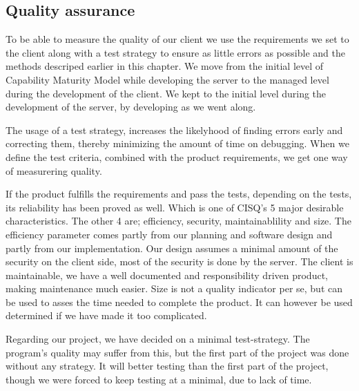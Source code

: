 \subsection{Quality assurance}
To be able to measure the quality of our client we use the requirements we set to the client along with a test strategy to ensure as little errors as possible and the methods descriped earlier in this chapter. We move from the initial level of Capability Maturity Model while developing the server to the managed level during the development of the client. We kept to the initial level during the development of the server, by developing as we went along.

The usage of a test strategy, increases the likelyhood of finding errors early and correcting them, thereby minimizing the amount of time on debugging. When we define the test criteria, combined with the product requirements, we get one way of measurering quality.

 If the product fulfills the requirements and pass the tests, depending on the tests, its reliability has been proved as well. Which is one of CISQ's 5 major desirable characteristics. The other 4 are; efficiency, security, maintainablility and size. The efficiency parameter comes partly from our planning and software design and partly from our implementation.
 Our design assumes a minimal amount of the security on the client side, most of the security is done by the server.
 The client is maintainable, we have a well documented and responsibility driven product, making maintenance much easier. 
 Size is not a quality indicator per se, but can be used to asses the time needed to complete the product. It can however be used determined if we have made it too complicated.
 
 Regarding our project, we have decided on a minimal test-strategy. The program's quality may suffer from this, but the first part of the project was done without any strategy. It will better testing than the first part of the project, though we were forced to keep testing at a minimal, due to lack of time.